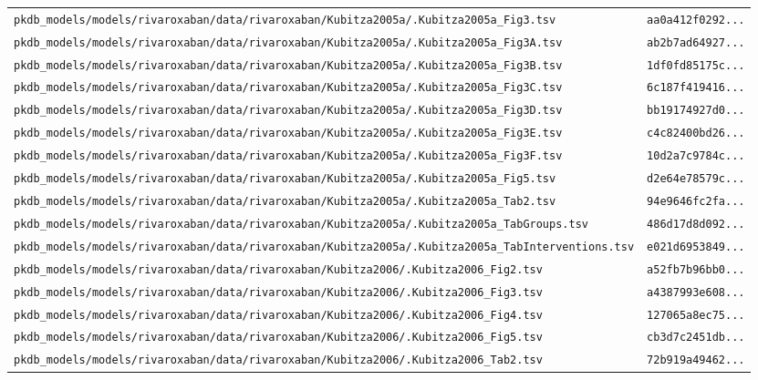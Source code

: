 \documentclass{article}
\begin{document}
\begin{longtable}{ll}
\texttt{pkdb\_models/models/rivaroxaban/data/rivaroxaban/Kubitza2005a/.Kubitza2005a\_Fig3.tsv} & \texttt{aa0a412f0292...} \\
\texttt{pkdb\_models/models/rivaroxaban/data/rivaroxaban/Kubitza2005a/.Kubitza2005a\_Fig3A.tsv} & \texttt{ab2b7ad64927...} \\
\texttt{pkdb\_models/models/rivaroxaban/data/rivaroxaban/Kubitza2005a/.Kubitza2005a\_Fig3B.tsv} & \texttt{1df0fd85175c...} \\
\texttt{pkdb\_models/models/rivaroxaban/data/rivaroxaban/Kubitza2005a/.Kubitza2005a\_Fig3C.tsv} & \texttt{6c187f419416...} \\
\texttt{pkdb\_models/models/rivaroxaban/data/rivaroxaban/Kubitza2005a/.Kubitza2005a\_Fig3D.tsv} & \texttt{bb19174927d0...} \\
\texttt{pkdb\_models/models/rivaroxaban/data/rivaroxaban/Kubitza2005a/.Kubitza2005a\_Fig3E.tsv} & \texttt{c4c82400bd26...} \\
\texttt{pkdb\_models/models/rivaroxaban/data/rivaroxaban/Kubitza2005a/.Kubitza2005a\_Fig3F.tsv} & \texttt{10d2a7c9784c...} \\
\texttt{pkdb\_models/models/rivaroxaban/data/rivaroxaban/Kubitza2005a/.Kubitza2005a\_Fig5.tsv} & \texttt{d2e64e78579c...} \\
\texttt{pkdb\_models/models/rivaroxaban/data/rivaroxaban/Kubitza2005a/.Kubitza2005a\_Tab2.tsv} & \texttt{94e9646fc2fa...} \\
\texttt{pkdb\_models/models/rivaroxaban/data/rivaroxaban/Kubitza2005a/.Kubitza2005a\_TabGroups.tsv} & \texttt{486d17d8d092...} \\
\texttt{pkdb\_models/models/rivaroxaban/data/rivaroxaban/Kubitza2005a/.Kubitza2005a\_TabInterventions.tsv} & \texttt{e021d6953849...} \\
\texttt{pkdb\_models/models/rivaroxaban/data/rivaroxaban/Kubitza2006/.Kubitza2006\_Fig2.tsv} & \texttt{a52fb7b96bb0...} \\
\texttt{pkdb\_models/models/rivaroxaban/data/rivaroxaban/Kubitza2006/.Kubitza2006\_Fig3.tsv} & \texttt{a4387993e608...} \\
\texttt{pkdb\_models/models/rivaroxaban/data/rivaroxaban/Kubitza2006/.Kubitza2006\_Fig4.tsv} & \texttt{127065a8ec75...} \\
\texttt{pkdb\_models/models/rivaroxaban/data/rivaroxaban/Kubitza2006/.Kubitza2006\_Fig5.tsv} & \texttt{cb3d7c2451db...} \\
\texttt{pkdb\_models/models/rivaroxaban/data/rivaroxaban/Kubitza2006/.Kubitza2006\_Tab2.tsv} & \texttt{72b919a49462...} \\

\end{longtable}
\end{document}
